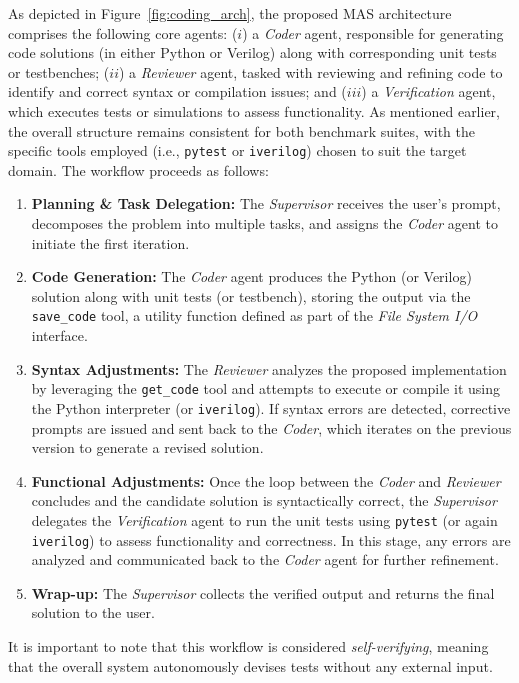 As depicted in Figure~\ref{fig:coding_arch}, the proposed MAS architecture comprises the following core agents: ($i$) a {\em Coder} agent, responsible for generating code solutions (in either Python or Verilog) along with corresponding unit tests or testbenches; ($ii$) a {\em Reviewer} agent, tasked with reviewing and refining code to identify and correct syntax or compilation issues; and ($iii$) a {\em Verification} agent, which executes tests or simulations to assess functionality. As mentioned earlier, the overall structure remains consistent for both benchmark suites, with the specific tools employed (i.e., {\tt pytest} or {\tt iverilog}) chosen to suit the target domain. The workflow proceeds as follows:
\begin{enumerate}
    \item \textbf{Planning \& Task Delegation:} The {\em Supervisor} receives the user's prompt, decomposes the problem into multiple tasks, and assigns the {\em Coder} agent to initiate the first iteration.
    \item \textbf{Code Generation:} The {\em Coder} agent produces the Python (or Verilog) solution along with unit tests (or testbench), storing the output via the \texttt{save\_code} tool, a utility function defined as part of the {\em File System I/O} interface.
    \item \textbf{Syntax Adjustments:} The {\em Reviewer} analyzes the proposed implementation by leveraging the \texttt{get\_code} tool and attempts to execute or compile it using the Python interpreter (or {\tt iverilog}). If syntax errors are detected, corrective prompts are issued and sent back to the {\em Coder}, which iterates on the previous version to generate a revised solution.
    \item \textbf{Functional Adjustments:} Once the loop between the {\em Coder} and {\em Reviewer} concludes and the candidate solution is syntactically correct, the {\em Supervisor} delegates the {\em Verification} agent to run the unit tests using \texttt{pytest} (or again {\tt iverilog}) to assess functionality and correctness. In this stage, any errors are analyzed and communicated back to the {\em Coder} agent for further refinement.
    \item \textbf{Wrap-up:} The {\em Supervisor} collects the verified output and returns the final solution to the user.
\end{enumerate}

It is important to note that this workflow is considered {\em self-verifying}, meaning that the overall system autonomously devises tests without any external input.

